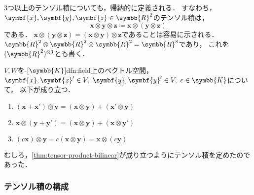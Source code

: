 \documentclass[../sotsu.tex]{subfiles}
\begin{document}
3つ以上のテンソル積についても，帰納的に定義される．
すなわち，$\symbf{x}, \symbf{y}, \symbf{z} \in \symbb{R}^2$のテンソル積は，
\begin{equation*}
    \symbf{x} \otimes \symbf{y} \otimes \symbf{z}
    \coloneq 
    \symbf{x} \otimes (\symbf{y} \otimes \symbf{z})
\end{equation*}
である．
$\symbf{x} \otimes (\symbf{y} \otimes \symbf{z}) = (\symbf{x} \otimes \symbf{y}) \otimes \symbf{z}$であることは容易に示される．
$\symbb{R}^2 \otimes \symbb{R}^2 \otimes \symbb{R}^2 = \symbb{R}^8$であり，
これを$(\symbb{R}^2)^{\otimes 3}$とも書く．


\begin{proposition}
    \label{thm:tensor-product-bilinear}
    $V, W$を-[$\symbb{K}$]{dfn:field}上のベクトル空間，
    $\symbf{x}, \symbf{x}' \in V, \  \symbf{y}, \symbf{y}' \in V, \  c \in \symbb{K}$について，
    以下が成り立つ．
    \begin{enumerate}
        \item $(\symbf{x} + \symbf{x}') \otimes \symbf{y} = (\symbf{x} \otimes \symbf{y}) + (\symbf{x}' \otimes \symbf{y})$
        \item $\symbf{x} \otimes (\symbf{y} + \symbf{y}') = (\symbf{x} \otimes \symbf{y}) + (\symbf{x} \otimes \symbf{y}')$
        \item $(c \symbf{x}) \otimes \symbf{y} = c (\symbf{x} \otimes \symbf{y}) = \symbf{x} \otimes (c \symbf{y})$
    \end{enumerate}
\end{proposition}

むしろ，\cref{thm:tensor-product-bilinear}が成り立つようにテンソル積を定めたのであった．




\subsubsection{テンソル積の構成}
\end{document}
